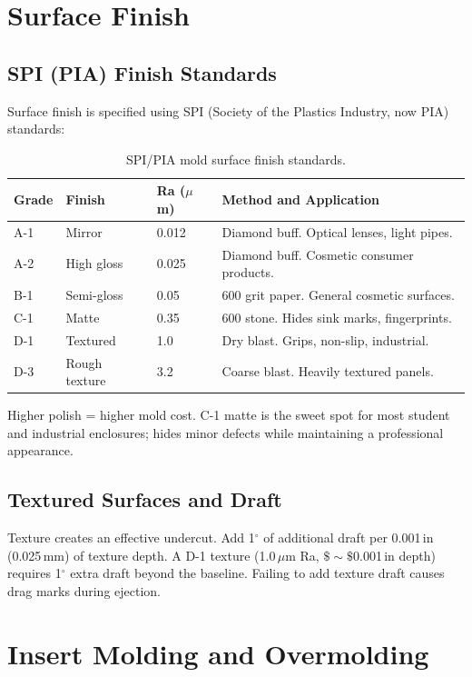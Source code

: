 \documentclass[11pt,letterpaper,twoside,openany]{book}
\providecommand{\ang}[1]{#1\ensuremath{{}^{\circ}}}
\begin{document}
\section{Surface Finish}
\subsection{SPI (PIA) Finish Standards}
Surface finish is specified using SPI (Society of the Plastics Industry, now PIA) standards:

\begin{table}[htbp]\centering\small
\begin{tabularx}{\textwidth}{l l l X}
\toprule
\textbf{Grade} & \textbf{Finish} & \textbf{Ra ($\mu$m)} & \textbf{Method and Application} \\
\midrule
A-1 & Mirror & 0.012 & Diamond buff. Optical lenses, light pipes. \\
A-2 & High gloss & 0.025 & Diamond buff. Cosmetic consumer products. \\
B-1 & Semi-gloss & 0.05 & 600 grit paper. General cosmetic surfaces. \\
C-1 & Matte & 0.35 & 600 stone. Hides sink marks, fingerprints. \\
D-1 & Textured & 1.0 & Dry blast. Grips, non-slip, industrial. \\
D-3 & Rough texture & 3.2 & Coarse blast. Heavily textured panels. \\
\bottomrule
\end{tabularx}
\caption{SPI/PIA mold surface finish standards.}
\end{table}

Higher polish = higher mold cost. C-1 matte is the sweet spot for most student and industrial enclosures; hides minor defects while maintaining a professional appearance.

\subsection{Textured Surfaces and Draft}
Texture creates an effective undercut. Add \ang{1} of additional draft per 0.001\,in (0.025\,mm) of texture depth. A D-1 texture (1.0\,$\mu$m Ra, $\$\sim\$$0.001\,in depth) requires \ang{1} extra draft beyond the baseline. Failing to add texture draft causes drag marks during ejection.

\section{Insert Molding and Overmolding}
\end{document}
